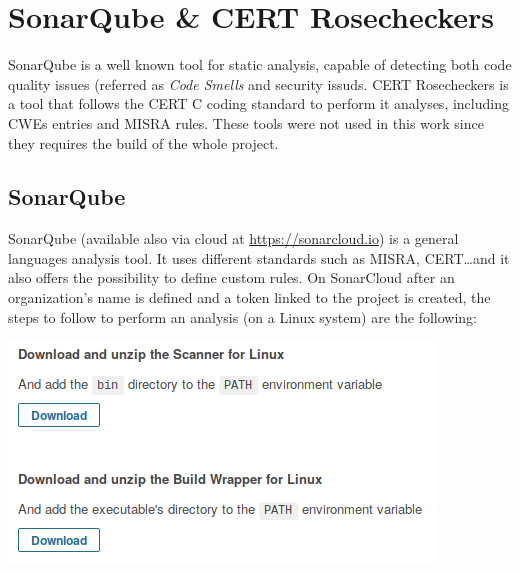 \section{SonarQube \& CERT Rosecheckers}

SonarQube is a well known tool for static analysis, capable of detecting both code quality issues (referred as \textsl{Code Smells} and security issuds.\newline
CERT Rosecheckers is a tool that follows the CERT C coding standard to perform it analyses, including CWEs entries and MISRA rules.\newline\newline
These tools were not used in this work since they requires the build of the whole project.

\subsection{SonarQube}

SonarQube (available also via cloud at \url{https://sonarcloud.io}) is a general languages analysis tool. It uses different standards such as MISRA, CERT\dots and it also offers the possibility to define custom rules.\newline
On SonarCloud after an organization's name is defined and a token linked to the project is created, the steps to follow to perform an analysis (on a Linux system) are the following:
\vspace{1cm}

\begin{minipage}{\linewidth}
	\includegraphics[width=\textwidth]{img/sonarqube-init.png}
\end{minipage}

